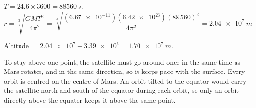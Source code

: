 \documentclass[12pt]{article}
\begin{document}
\ansq
{}
\begin{crit}
\end{crit}
\sample
$T = 24.6 \times 3600 = \qty{88560}{s}$.
\[ r = \sqrt[3]{\frac{GMT^2}{4\pi^2}} = \sqrt[3]{\frac{(\num{6.67e-11})(\num{6.42e23})(88\,560)^2}{4\pi^2}}
   = \qty{2.04e7}{m} \]
\begin{crit}
\end{crit}
\sample
Altitude $= \num{2.04e7} - \num{3.39e6} = \qty{1.70e7}{m}$.
\begin{crit}
\end{crit}
\sample
To stay above one point, the satellite must go around once in the same time as Mars rotates, and in
the same direction, so it keeps pace with the surface. Every orbit is centred on the centre of Mars.
An orbit tilted to the equator would carry the satellite north and south of the equator during each
orbit, so only an orbit directly above the equator keeps it above the same point.
\end{document}

